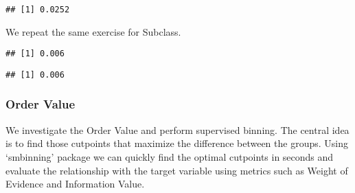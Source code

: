 \documentclass[
]{article}
\newenvironment{Shaded}{\begin{snugshade}}{\end{snugshade}}
\newcommand{\DataTypeTok}[1]{\textcolor[rgb]{0.13,0.29,0.53}{#1}}
\newcommand{\FloatTok}[1]{\textcolor[rgb]{0.00,0.00,0.81}{#1}}
\newcommand{\KeywordTok}[1]{\textcolor[rgb]{0.13,0.29,0.53}{\textbf{#1}}}
\newcommand{\NormalTok}[1]{#1}
\newcommand{\OperatorTok}[1]{\textcolor[rgb]{0.81,0.36,0.00}{\textbf{#1}}}
\newcommand{\StringTok}[1]{\textcolor[rgb]{0.31,0.60,0.02}{#1}}
\begin{document}
\begin{verbatim}
## [1] 0.0252
\end{verbatim}

We repeat the same exercise for Subclass.

\begin{Shaded}
\end{Shaded}

\begin{verbatim}
## [1] 0.006
\end{verbatim}

\begin{Shaded}
\end{Shaded}

\begin{verbatim}
## [1] 0.006
\end{verbatim}

\hypertarget{order-value}{%
\subsubsection{Order Value}\label{order-value}}

We investigate the Order Value and perform supervised binning. The
central idea is to find those cutpoints that maximize the difference
between the groups. Using `smbinning' package we can quickly find the
optimal cutpoints in seconds and evaluate the relationship with the
target variable using metrics such as Weight of Evidence and Information
Value.

\begin{Shaded}
\end{Shaded}
\end{document}
